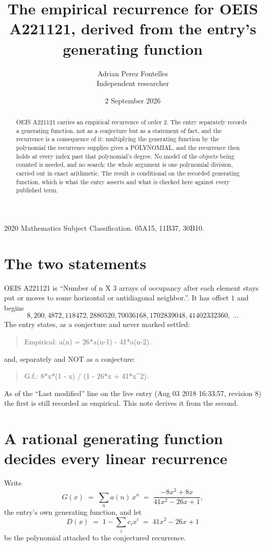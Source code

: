 \documentclass[11pt,a4paper]{article}
\title{The empirical recurrence for OEIS A221121, derived from the entry's generating function}
\author{Adrian Perez Fontelles\\ \small Independent researcher}
\date{2 September 2026}
\theoremstyle{plain}
\theoremstyle{definition}
\begin{document}
\maketitle

\begin{abstract}
OEIS A221121 carries an empirical recurrence of order $2$. The entry separately records a
generating function, not as a conjecture but as a statement of fact, and the recurrence is a
consequence of it: multiplying the generating function by the polynomial the recurrence
supplies gives a POLYNOMIAL, and the recurrence then holds at every index past that
polynomial's degree. No model of the objects being counted is needed, and no search: the
whole argument is one polynomial division, carried out in exact arithmetic. The result is
conditional on the recorded generating function, which is what the entry asserts and what is
checked here against every published term.
\end{abstract}

\noindent\small 2020 Mathematics Subject Classification. 05A15, 11B37, 30B10.\normalsize

\section{The two statements}

OEIS A221121 is ``Number of n X 3 arrays of occupancy after each element stays put or moves to some horizontal or antidiagonal neighbor.''. It has offset $1$ and begins
\[
8, 200, 4872, 118472, 2880520, 70036168, 1702839048, 41402332360,\ \dots
\]
The entry states, as a conjecture and never marked settled:
\begin{quote}
Empirical: a(n) = 26*a(n-1) - 41*a(n-2).
\end{quote}
and, separately and NOT as a conjecture:
\begin{quote}
G.f.: 8*x*(1 - x) / (1 - 26*x + 41*x\^{}2).
\end{quote}
As of the ``Last modified'' line on the live entry (Aug 03 2018 16:33:57, revision 8) the first is still
recorded as empirical. This note derives it from the second.

\section{A rational generating function decides every linear recurrence}

Write
\[
G(x)\;=\;\sum_{n}a(n)\,x^{n}\;=\;\frac{- 8 x^{2} + 8 x}{41 x^{2} - 26 x + 1},
\]
the entry's own generating function, and let
\[
D(x)\;=\;1-\sum_i c_i x^{i}\;=\;41 x^{2} - 26 x + 1
\]
be the polynomial attached to the conjectured recurrence.
\end{document}
